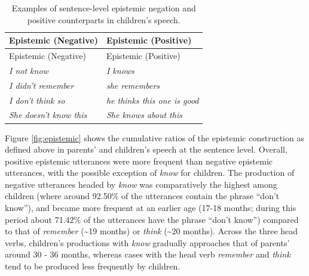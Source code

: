 \documentclass[
  english,
  man,floatsintext]{apa6}
\begin{document}
\begin{longtable}[]{@{}ll@{}}
\caption{\label{tab:epistem} Examples of sentence-level epistemic negation and positive counterparts in children's speech.}\tabularnewline
\toprule
Epistemic (Negative) & Epistemic (Positive) \\
\midrule
\endfirsthead
\toprule
Epistemic (Negative) & Epistemic (Positive) \\
\midrule
\endhead
\emph{I not know} & \emph{I knows} \\
\emph{I didn't remember} & \emph{she remembers} \\
\emph{I don't think so} & \emph{he thinks this one is good} \\
\emph{She doesn't know this} & \emph{She knows about this} \\
\bottomrule
\end{longtable}

Figure \ref{fig:epistemic} shows the cumulative ratios of the epistemic construction as defined above in parents' and children's speech at the sentence level. Overall, positive epistemic utterances were more frequent than negative epistemic utterances, with the possible exception of \emph{know} for children. The production of negative utterances headed by \emph{know} was comparatively the highest among children (where around 92.50\% of the utterances contain the phrase ``don't know''), and became more frequent at an earlier age (17-18 months; during this period about 71.42\% of the utterances have the phrase ``don't know'') compared to that of \emph{remember} (\textasciitilde19 months) or \emph{think} (\textasciitilde20 months). Across the three head verbs, children's productions with \emph{know} gradually approaches that of parents' around 30 - 36 months, whereas cases with the head verb \emph{remember} and \emph{think} tend to be produced less frequently by children.
\end{document}
